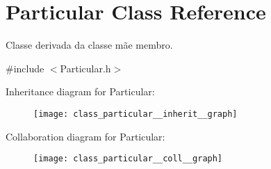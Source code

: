 \hypertarget{class_particular}{\section{Particular Class Reference}
\label{class_particular}
}


Classe derivada da classe mãe membro.  




{\ttfamily \#include $<$Particular.\+h$>$}



Inheritance diagram for Particular\+:\nopagebreak
\begin{figure}[H]
\begin{center}
\leavevmode
\texttt{[image: class\_particular\_\_inherit\_\_graph]}
\end{center}
\end{figure}


Collaboration diagram for Particular\+:\nopagebreak
\begin{figure}[H]
\begin{center}
\leavevmode
\texttt{[image: class\_particular\_\_coll\_\_graph]}
\end{center}
\end{figure}

